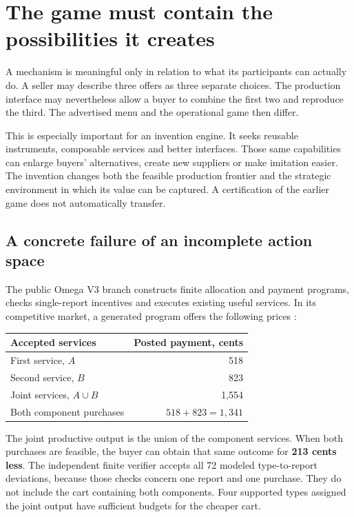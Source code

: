\section{The game must contain the possibilities it creates}\label{sec:strategic}
A mechanism is meaningful only in relation to what its participants can actually do. A seller may describe three offers as three separate choices. The production interface may nevertheless allow a buyer to combine the first two and reproduce the third. The advertised menu and the operational game then differ.

This is especially important for an invention engine. It seeks reusable instruments, composable services and better interfaces. Those same capabilities can enlarge buyers' alternatives, create new suppliers or make imitation easier. The invention changes both the feasible production frontier and the strategic environment in which its value can be captured. A certification of the earlier game does not automatically transfer.

\subsection{A concrete failure of an incomplete action space}
The public Omega V3 branch constructs finite allocation and payment programs, checks single-report incentives and executes existing useful services. In its competitive market, a generated program offers the following prices \cite{omegav3,omegav4}:
\begin{center}
\begin{tabularx}{.85\linewidth}{@{}Yr@{}}\toprule
Accepted services & Posted payment, cents\\\midrule
First service, $A$ & 518\\
Second service, $B$ & 823\\
Joint services, $A\cup B$ & 1,554\\
Both component purchases & $518+823=1,341$\\\bottomrule
\end{tabularx}
\end{center}
The joint productive output is the union of the component services. When both purchases are feasible, the buyer can obtain that same outcome for \textbf{213 cents less}. The independent finite verifier accepts all 72 modeled type-to-report deviations, because those checks concern one report and one purchase. They do not include the cart containing both components. Four supported types assigned the joint output have sufficient budgets for the cheaper cart.

